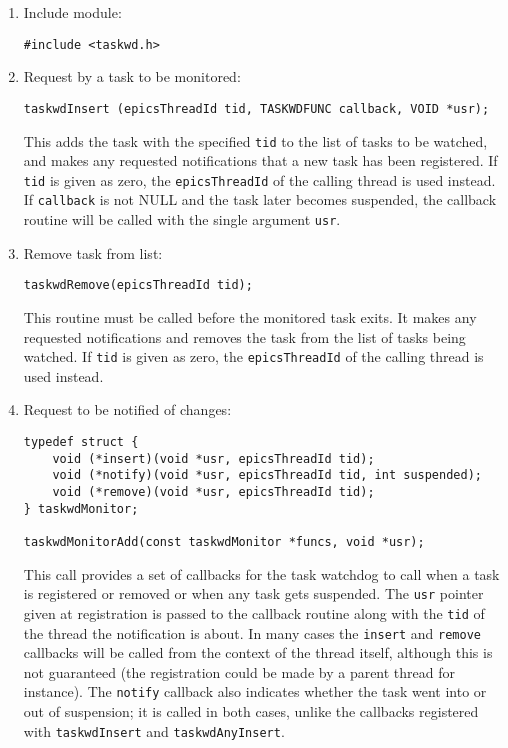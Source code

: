 \begin{enumerate}
\item Include module:

\begin{verbatim}
#include <taskwd.h>
\end{verbatim}

\item Request by a task to be monitored:

\begin{verbatim}
taskwdInsert (epicsThreadId tid, TASKWDFUNC callback, VOID *usr);
\end{verbatim}

This adds the task with the specified \verb|tid| to the list of tasks to be watched, and makes any requested notifications 
that a new task has been registered. If \verb|tid| is given as zero, the \verb|epicsThreadId| of the calling thread is used 
instead. If \verb|callback| is not NULL and the task later becomes suspended, the callback routine will be called with 
the single argument \verb|usr|.

\item Remove task from list:

\begin{verbatim}
taskwdRemove(epicsThreadId tid);
\end{verbatim}

This routine must be called before the monitored task exits. It makes any requested notifications and removes the 
task from the list of tasks being watched. If \verb|tid| is given as zero, the \verb|epicsThreadId| of the calling thread is 
used instead.

\item Request to be notified of changes:

\begin{verbatim}
typedef struct {
    void (*insert)(void *usr, epicsThreadId tid);
    void (*notify)(void *usr, epicsThreadId tid, int suspended);
    void (*remove)(void *usr, epicsThreadId tid);
} taskwdMonitor;

taskwdMonitorAdd(const taskwdMonitor *funcs, void *usr);
\end{verbatim}

This call provides a set of callbacks for the task watchdog to call when a task is registered or removed or when any 
task gets suspended. The \verb|usr| pointer given at registration is passed to the callback routine along with the \verb|tid| of 
the thread the notification is about. In many cases the \verb|insert| and \verb|remove| callbacks will be called from the 
context of the thread itself, although this is not guaranteed (the registration could be made by a parent thread for 
instance). The \verb|notify| callback also indicates whether the task went into or out of suspension; it is called in both 
cases, unlike the callbacks registered with \verb|taskwdInsert| and \verb|taskwdAnyInsert|.


\end{enumerate}
